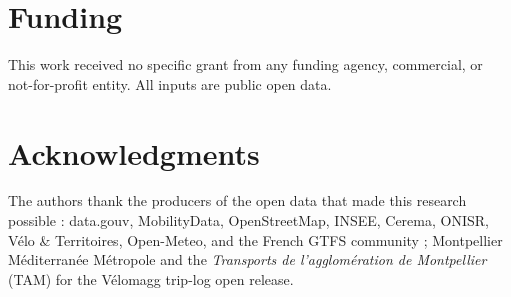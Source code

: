\documentclass[11pt,a4paper]{article}
\begin{document}
\section*{Funding}
This work received no specific grant from any funding agency,
commercial, or not-for-profit entity.  All inputs are public
open data.

\section*{Acknowledgments}
The authors thank the producers of the open data that made this
research possible : data.gouv, MobilityData, OpenStreetMap, INSEE,
Cerema, ONISR, V\'elo \& Territoires, Open-Meteo, and the French
GTFS community ; Montpellier M\'editerran\'ee M\'etropole and the
\emph{Transports de l'agglom\'eration de Montpellier} (TAM) for
the V\'elomagg trip-log open release.


\end{document}
